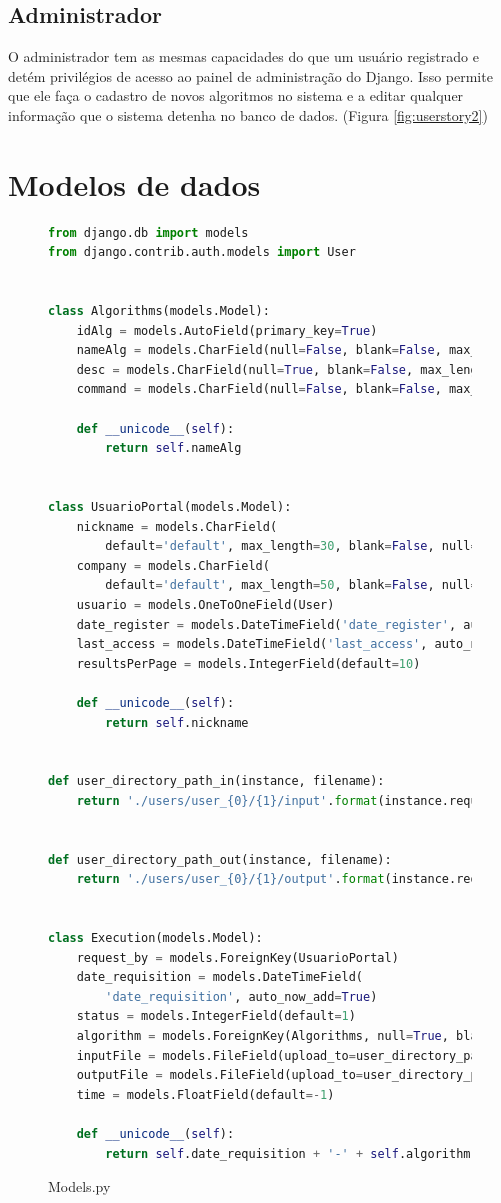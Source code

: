 \documentclass[tg]{mdtufsm}
\begin{document}
\subsection{Administrador}
O administrador tem as mesmas capacidades do que um usuário registrado e detém privilégios de acesso ao painel de administração do Django. Isso permite que ele faça o cadastro de novos algoritmos no sistema e a editar qualquer informação que o sistema detenha no banco de dados. (Figura \ref{fig:userstory2})


\section{Modelos de dados}
\begin{figure}
	\centering
	\begin{minipage}[c]{1\textwidth}
		\begin{lstlisting}[language=Python, frame=single]
from django.db import models
from django.contrib.auth.models import User


class Algorithms(models.Model):
	idAlg = models.AutoField(primary_key=True)
	nameAlg = models.CharField(null=False, blank=False, max_length=100)
	desc = models.CharField(null=True, blank=False, max_length=500)
	command = models.CharField(null=False, blank=False, max_length=100)

	def __unicode__(self):
		return self.nameAlg


class UsuarioPortal(models.Model):
	nickname = models.CharField(
		default='default', max_length=30, blank=False, null=True)
	company = models.CharField(
		default='default', max_length=50, blank=False, null=True)
	usuario = models.OneToOneField(User)
	date_register = models.DateTimeField('date_register', auto_now_add=True)
	last_access = models.DateTimeField('last_access', auto_now=True)
	resultsPerPage = models.IntegerField(default=10)

	def __unicode__(self):
		return self.nickname


def user_directory_path_in(instance, filename):
	return './users/user_{0}/{1}/input'.format(instance.request_by.usuario.id, instance.id)


def user_directory_path_out(instance, filename):
	return './users/user_{0}/{1}/output'.format(instance.request_by.usuario.id, instance.id)


class Execution(models.Model):
	request_by = models.ForeignKey(UsuarioPortal)
	date_requisition = models.DateTimeField(
		'date_requisition', auto_now_add=True)
	status = models.IntegerField(default=1)
	algorithm = models.ForeignKey(Algorithms, null=True, blank=False)
	inputFile = models.FileField(upload_to=user_directory_path_in, null=True)
	outputFile = models.FileField(upload_to=user_directory_path_out, null=True)
	time = models.FloatField(default=-1)
	
	def __unicode__(self):
		return self.date_requisition + '-' + self.algorithm + '-' + self.request_by.id
		\end{lstlisting}
		\clearpage
		\caption{
			Models.py
		}
		\label{fig:modelo}
	\end{minipage}
\end{figure}
\end{document}
